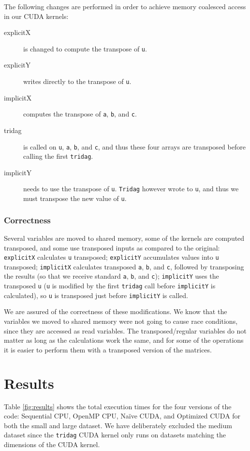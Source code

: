 \documentclass[12pt, oneside]{article}
\begin{document}
The following changes are performed in order to achieve memory coalesced access in our CUDA kernels:
\begin{description}
\item[explicitX] is changed to compute the transpose of \texttt{u}.
\item[explicitY] writes directly to the transpose of \texttt{u}.
\item[implicitX] computes the transpose of \texttt{a}, \texttt{b}, and \texttt{c}.
\item[tridag] is called on \texttt{u}, \texttt{a}, \texttt{b}, and \texttt{c}, and thus these four arrays are transposed before calling the first \texttt{tridag}.
\item[implicitY] needs to use the transpose of \texttt{u}. \texttt{Tridag} however wrote to \texttt{u}, and thus we must transpose the new value of \texttt{u}.
\end{description}

\subsubsection{Correctness}
Several variables are moved to shared memory, some of the kernels are computed transposed, and some use transposed inputs as compared to the original: \texttt{explicitX} calculates \texttt{u} transposed; \texttt{explicitY} accumulates values into \texttt{u} transposed; \texttt{implicitX} calculates transposed \texttt{a}, \texttt{b}, and \texttt{c}, followed by transposing the results (so that we receive standard \texttt{a}, \texttt{b}, and \texttt{c}); \texttt{implicitY} uses the transposed \texttt{u} (\texttt{u} is modified by the first \texttt{tridag} call before \texttt{implicitY} is calculated), so \texttt{u} is transposed just before \texttt{implicitY} is called.

We are assured of the correctness of these modifications. We know that the variables we moved to shared memory were not going to cause race conditions, since they are accessed as read variables. The transposed/regular variables do not matter as long as the calculations work the same, and for some of the operations it is easier to perform them with a transposed version of the matrices.
\section{Results}
Table \ref{fig:results} shows the total execution times for the four versions of the code: Sequential CPU, OpenMP CPU, Na\"ive CUDA, and Optimized CUDA for both the small and large dataset. We have deliberately excluded the medium dataset since the \texttt{tridag} CUDA kernel only runs on datasets matching the dimensions of the CUDA kernel.
\end{document}
